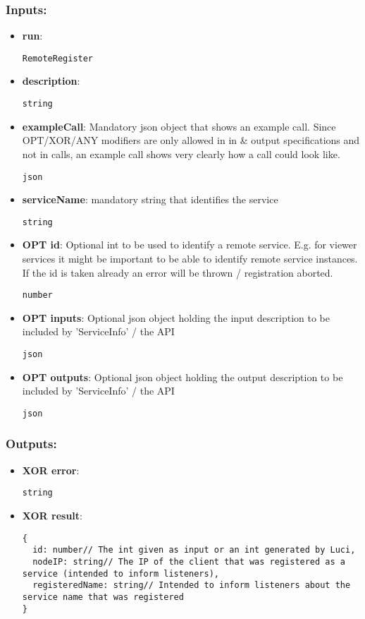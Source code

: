 \subsubsection*{Inputs:}
\begin{itemize}
  \small
    \item \textbf{run}: 
\begin{lstlisting}
RemoteRegister
\end{lstlisting}
    \item \textbf{description}: 
\begin{lstlisting}
string
\end{lstlisting}
    \item \textbf{exampleCall}: Mandatory json object that shows an example call. Since OPT/XOR/ANY  modifiers are only allowed in in \& output specifications and not in  calls, an example call shows very clearly how a call could look like.
\begin{lstlisting}
json
\end{lstlisting}
    \item \textbf{serviceName}: mandatory string that identifies the service
\begin{lstlisting}
string
\end{lstlisting}
    \item \textbf{OPT id}: Optional int to be used to identify a remote service. E.g. for  viewer services it might be important to be able to identify remote  service instances. If the id is taken already an error will be thrown /  registration aborted.
\begin{lstlisting}
number
\end{lstlisting}
    \item \textbf{OPT inputs}: Optional json object holding the input description to be included by 'ServiceInfo' / the API
\begin{lstlisting}
json
\end{lstlisting}
    \item \textbf{OPT outputs}: Optional json object holding the output description to be included by 'ServiceInfo' / the API
\begin{lstlisting}
json
\end{lstlisting}
  \end{itemize}
\subsubsection*{Outputs:}
\begin{itemize}
  \small
    \item \textbf{XOR error}: 
\begin{lstlisting}
string
\end{lstlisting}
    \item \textbf{XOR result}: 
\begin{lstlisting}
{
  id: number// The int given as input or an int generated by Luci, 
  nodeIP: string// The IP of the client that was registered as a service (intended to inform listeners), 
  registeredName: string// Intended to inform listeners about the service name that was registered
}
\end{lstlisting}
  \end{itemize}

